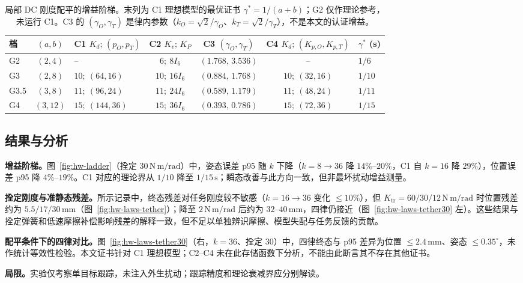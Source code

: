 \begin{table}[!tbp]
\centering\small
\caption{局部 DC 刚度配平的增益阶梯。末列为 C1 理想模型的最优证书 $\gamma^*=1/(a+b)$；G2 仅作理论参考，未运行 C1。C3 的 $(\gamma_O,\gamma_T)$ 是律内参数（$k_O=\sqrt2/\gamma_O$、$k_T=\sqrt2/\gamma_T$），不是本文的认证增益。}
\label{tab:hw-gains}
\begin{tabular}{@{}lclcccl@{}}
\toprule
档 & $(a,b)$ & C1 $K_d;\,(p_O,p_T)$ & C2 $K_v;\,K_P$ & C3 $(\gamma_O,\gamma_T)$ & C4 $K_d;\,(K_{p,O},K_{p,T})$ & $\gamma^{*}$ (s) \\
\midrule
G2 & $(2,4)$ & -- & $6;\ 8I_6$ & $(1.768,\,3.536)$ & -- & $1/6$ \\
G3 & $(2,8)$ & $10;\ (64,16)$ & $10;\ 16I_6$ & $(0.884,\,1.768)$ & $10;\ (32,16)$ & $1/10$ \\
G3.5 & $(3,8)$ & $11;\ (96,24)$ & $11;\ 24I_6$ & $(0.589,\,1.179)$ & $11;\ (48,24)$ & $1/11$ \\
G4 & $(3,12)$ & $15;\ (144,36)$ & $15;\ 36I_6$ & $(0.393,\,0.786)$ & $15;\ (72,36)$ & $1/15$ \\
\bottomrule
\end{tabular}
\end{table}

\subsection{结果与分析}

\textbf{增益阶梯。}图~\ref{fig:hw-ladder}（拴定 $30\,\mathrm{N\,m/rad}$）中，姿态误差 p95 随 $k$ 下降（$k=8{\to}36$ 降 $14\%$--$20\%$，C1 自 $k=16$ 降 $29\%$），位置误差 p95 降 $4\%$--$19\%$。C1 对应的理论界从 $1/10$ 降至 $1/15\,\mathrm{s}$；瞬态改善与此方向一致，但非最坏扰动增益测量。

\textbf{拴定刚度与准静态残差。}所示记录中，终态残差对任务刚度较不敏感（$k=16{\to}36$ 变化 $\le10\%$），但 $K_{\mathrm{tr}}=60/30/12\,\mathrm{N\,m/rad}$ 时位置残差约为 $5.5/17/30\,\mathrm{mm}$（图~\ref{fig:hw-laws-tether}）；降至 $2\,\mathrm{N\,m/rad}$ 后约为 $32$--$40\,\mathrm{mm}$，四律仍接近（图~\ref{fig:hw-laws-tether30} 左）。这些结果与拴定弹簧和低速摩擦补偿影响残差的解释一致，但不足以单独辨识摩擦、模型失配与任务反馈的贡献。

\textbf{配平条件下的四律对比。}图~\ref{fig:hw-laws-tether30}（右，$k=36$、拴定 $30$）中，四律终态与 p95 差异为位置 $\le2.4\,\mathrm{mm}$、姿态 $\le0.35^\circ$，未作统计等效性检验。本文证书针对 C1 理想模型；C2--C4 未在此存储函数下分析，不能由此断言其不存在其他证书。

\textbf{局限。}实验仅考察单目标跟踪，未注入外生扰动；跟踪精度和理论衰减界应分别解读。

